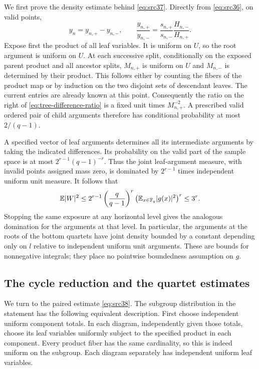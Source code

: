We first prove the density estimate behind \eqref{eq:src37}.  Directly
from \eqref{eq:src36}, on valid points,
\begin{equation}\label{eq:tree-difference-ratio}
 y_n=y_{n,+}-y_{n,-},\qquad
 \frac{y_{n,+}}{y_{n,-}}
       =\frac{s_{n,+}}{s_{n,-}}\frac{H_{n,-}}{H_{n,+}}.
\end{equation}
Expose first the product of all leaf variables.  It is uniform on $U$,
so the root argument is uniform on $U$.  At each successive split,
conditionally on the exposed parent product and all ancestor splits,
$M_{n,+}$ is uniform on $U$ and $M_{n,-}$ is determined by their product.
This follows either by counting the fibers of the product map or by
induction on the two disjoint sets of descendant leaves.  The current
entries are already known at this point.  Consequently the ratio on the
right of \eqref{eq:tree-difference-ratio} is a fixed unit times
$M_{n,+}^{-2}$.  A prescribed valid ordered pair of child arguments
therefore has conditional probability at most $2/(q-1)$.

A specified vector of leaf arguments determines all its intermediate
arguments by taking the indicated differences.  Its probability on the
valid part of the sample space is at most
$2^{r-1}(q-1)^{-r}$.  Thus the joint leaf-argument measure, with invalid
points assigned mass zero, is dominated by $2^{r-1}$ times independent
uniform unit measure.  It follows that
\[
 \mathbb E|W|^2
 \leq 2^{r-1}\left(\frac q{q-1}\right)^r
                  \bigl(\mathbb E_{x\in\mathbb F_q}|g(x)|^2\bigr)^r
 \leq3^r.
\]
Stopping the same exposure at any horizontal level gives the analogous
domination for the arguments at that level.  In particular, the arguments
at the roots of the bottom quartets have joint density bounded by a
constant depending only on $l$ relative to independent uniform unit
arguments.  These are bounds for nonnegative integrals; they place no
pointwise boundedness assumption on $g$.

\subsection{The cycle reduction and the quartet estimates}

We turn to the paired estimate \eqref{eq:src38}. The subgroup distribution
in the statement has the following equivalent description. First choose
independent uniform component totals. In each diagram, independently
given those totals, choose its leaf variables uniformly subject to
the specified product in each component. Every product fiber has the
same cardinality, so this is indeed uniform on the subgroup. Each
diagram separately has independent uniform leaf variables.

